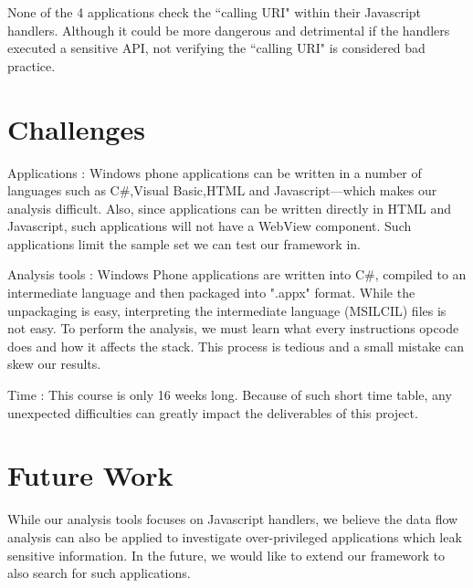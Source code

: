 \documentclass[conference]{IEEEtran}
\begin{document}
None of the 4 applications check the ``calling URI" within their Javascript handlers.
Although it could be more dangerous and detrimental if the handlers executed a sensitive API, not verifying the ``calling URI" is considered bad practice.

\section{Challenges}

Applications :  Windows phone applications can be written in a number of languages such as C\#,Visual Basic,HTML and Javascript---which makes our analysis difficult. Also, since applications can be written directly in HTML and Javascript, such applications will not have a WebView component. Such applications limit the sample set we can test our framework in.

Analysis tools : Windows Phone applications are written into C\#, compiled to an intermediate language and then packaged into ".appx" format. While the unpackaging is easy, interpreting the intermediate language (MSIL\/CIL) files is not easy. To perform the analysis, we must learn what every instructions opcode does and how it affects the stack. This process is tedious and a small mistake can skew our results.

Time : This course is only 16 weeks long. Because of such short time table, any unexpected difficulties can greatly impact the deliverables of this project.


\section{Future Work}

While our analysis tools focuses on Javascript handlers, we believe the data flow analysis can also be applied to investigate over-privileged applications which leak sensitive information.
In the future, we would like to extend our framework to also search for such applications.
\end{document}
